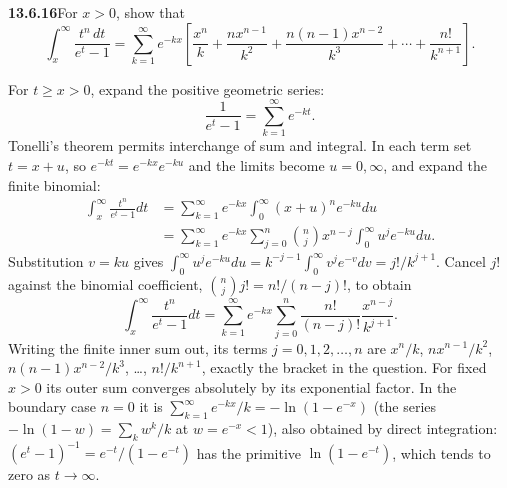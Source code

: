 \par\bigskip
\noindent\textbf{13.6.16}\quad For $x>0$, show that
\[
\int_{x}^{\infty}\frac{t^{n}\,dt}{e^{t}-1}
=\sum_{k=1}^{\infty}e^{-kx}\left[\frac{x^{n}}{k}+\frac{nx^{n-1}}{k^{2}}
+\frac{n(n-1)x^{n-2}}{k^{3}}+\cdots+\frac{n!}{k^{n+1}}\right].
\]
\par\smallskip
{}
\solution
{}  For $t\ge x>0$, expand the positive geometric series:
\[
\frac1{e^t-1}=\sum_{k=1}^{\infty}e^{-kt}.
\]
Tonelli's theorem permits interchange of sum and integral.
In each term set $t=x+u$, so $e^{-kt}=e^{-kx}e^{-ku}$ and the
limits become $u=0,\infty$, and expand the finite binomial:
\begin{align*}
\int_x^\infty\frac{t^n}{e^t-1}dt
&=\sum_{k=1}^{\infty}e^{-kx}
\int_0^\infty(x+u)^ne^{-ku}du\\
&=\sum_{k=1}^{\infty}e^{-kx}
\sum_{j=0}^n\binom nj x^{n-j}
\int_0^\infty u^je^{-ku}du.
\end{align*}
Substitution $v=ku$ gives
$\int_0^\infty u^je^{-ku}du=k^{-j-1}\int_0^\infty v^je^{-v}dv
=j!/k^{j+1}$.
Cancel $j!$ against the binomial coefficient,
$\binom nj j!=n!/(n-j)!$, to obtain
\[
\boxed{\int_x^\infty\frac{t^n}{e^t-1}dt
=\sum_{k=1}^{\infty}e^{-kx}
\sum_{j=0}^n\frac{n!}{(n-j)!}\frac{x^{n-j}}{k^{j+1}}}.
\]
Writing the finite inner sum out, its terms $j=0,1,2,\ldots,n$ are
$x^n/k$, $nx^{n-1}/k^2$, $n(n-1)x^{n-2}/k^3$, \dots, $n!/k^{n+1}$,
exactly the bracket in the question.  For fixed $x>0$ its outer
sum converges absolutely by its exponential factor.  In the
boundary case $n=0$ it is
$\sum_{k=1}^{\infty}e^{-kx}/k=-\ln(1-e^{-x})$ (the series
$-\ln(1-w)=\sum_kw^k/k$ at $w=e^{-x}<1$), also obtained by direct
integration: $(e^t-1)^{-1}=e^{-t}/(1-e^{-t})$ has the primitive
$\ln(1-e^{-t})$, which tends to zero as $t\to\infty$.

